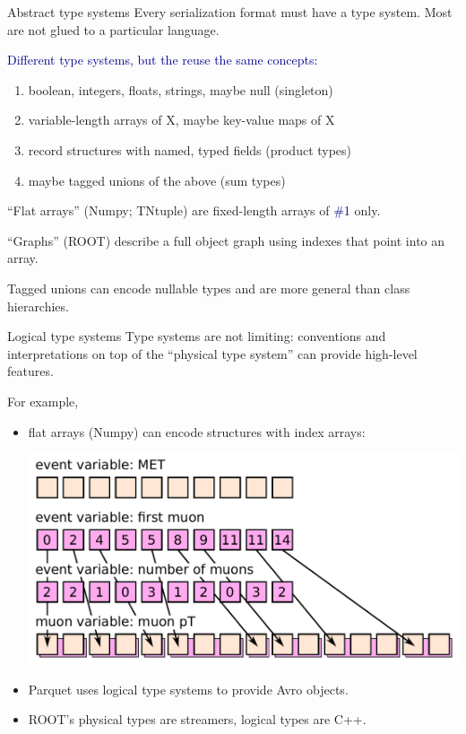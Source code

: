 \documentclass{beamer}
\begin{document}
\begin{frame}{Abstract type systems}
\vspace{0.25 cm}
Every serialization format must have a type system. Most are not glued to a particular language.

\vspace{0.4 cm}
\textcolor{darkblue}{Different type systems, but the reuse the same concepts:}
\begin{enumerate}
\item boolean, integers, floats, strings, maybe null (singleton)
\item variable-length arrays of X, maybe key-value maps of X
\item record structures with named, typed fields (product types)
\item maybe tagged unions of the above (sum types)
\end{enumerate}

\vspace{0.4 cm}
``Flat arrays'' (Numpy; TNtuple) are fixed-length arrays of \textcolor{darkblue}{\#1} only.

\vspace{0.4 cm}
``Graphs'' (ROOT) describe a full object graph using indexes that point into an array.

\vspace{0.4 cm}
Tagged unions can encode nullable types and are more general than class hierarchies.
\end{frame}

\begin{frame}{Logical type systems}
\vspace{0.25 cm}
Type systems are not limiting: conventions and interpretations on top of the ``physical type system'' can provide high-level features.

\vspace{0.1 cm}
For example,

\begin{itemize}
\item flat arrays (Numpy) can encode structures with index arrays:

\includegraphics[width=0.8\linewidth]{hierarchical_arrays.pdf}

\item Parquet uses logical type systems to provide Avro objects.

\item ROOT's physical types are streamers, logical types are C++.
\end{itemize}
\end{frame}
\end{document}
